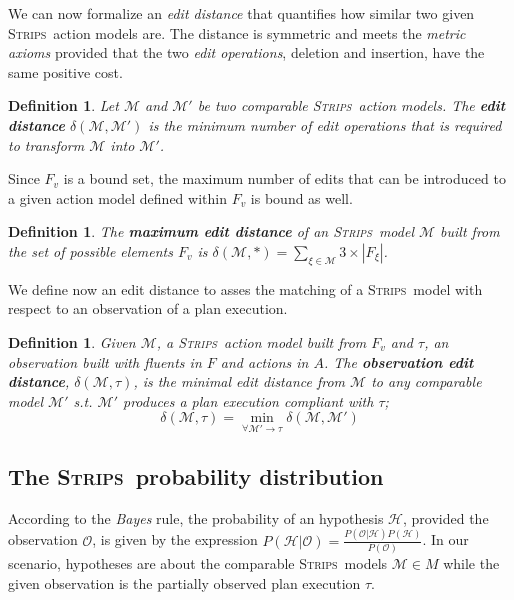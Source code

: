 \documentclass[letterpaper]{article} %
\newcommand{\strips}{\textsc{Strips}}     %
\newtheorem{definition}[theorem]{Definition}
\begin{document}
We can now formalize an {\em edit distance} that quantifies how similar two given \strips\ action models are. The distance is symmetric and meets the {\em metric axioms} provided that the two {\em edit operations}, deletion and insertion, have the same positive cost.

\begin{definition}
  Let $\mathcal{M}$ and $\mathcal{M}'$ be two {\em comparable} \strips\ action models. The {\bf edit distance} $\delta(\mathcal{M},\mathcal{M}')$ is the minimum number of {\em edit operations} that is required to transform $\mathcal{M}$ into $\mathcal{M}'$.
\end{definition}

Since $F_v$ is a bound set, the maximum number of edits that can be introduced to a given action model defined within $F_v$ is bound as well. 
\begin{definition}
The \textbf{maximum edit distance} of an \strips\ model $\mathcal{M}$ built from the set of possible elements $F_v$ is $\delta(\mathcal{M},*)=\sum_{\xi\in\mathcal{M}} 3\times|F_{\xi}|$.
\end{definition}

We define now an edit distance to asses the matching of a \strips\ model with respect to an observation of a plan execution. 

\begin{definition}
  Given $\mathcal{M}$, a \strips\ action model built from $F_v$ and $\tau$, an observation built with fluents in $F$ and actions in $A$. The {\bf observation edit distance}, $\delta(\mathcal{M},\tau)$, is the minimal edit distance from $\mathcal{M}$ to any {\em comparable} model $\mathcal{M}'$ s.t. $\mathcal{M}'$ produces a plan execution compliant with $\tau$; \[\delta(\mathcal{M},\tau)=\min_{\forall \mathcal{M}' \rightarrow \tau} \delta(\mathcal{M},\mathcal{M}')\]
\end{definition}


\subsection{The \strips\ probability distribution}
According to the {\em Bayes} rule, the probability of an hypothesis $\mathcal{H}$, provided the observation $\mathcal{O}$, is given by the expression $P(\mathcal{H}|\mathcal{O})=\frac{P(\mathcal{O}|\mathcal{H})P(\mathcal{H})}{P(\mathcal{O})}$. In our scenario, hypotheses are about the comparable \strips\ models $\mathcal{M}\in M$ while the given observation is the partially observed plan execution $\tau$.
\end{document}
